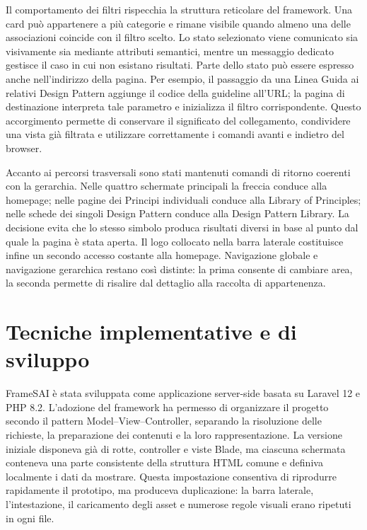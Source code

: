 Il comportamento dei filtri rispecchia la struttura reticolare del framework. Una card può appartenere a più categorie e rimane visibile quando almeno una delle associazioni coincide con il filtro scelto. Lo stato selezionato viene comunicato sia visivamente sia mediante attributi semantici, mentre un messaggio dedicato gestisce il caso in cui non esistano risultati. Parte dello stato può essere espresso anche nell'indirizzo della pagina. Per esempio, il passaggio da una Linea Guida ai relativi Design Pattern aggiunge il codice della guideline all'URL; la pagina di destinazione interpreta tale parametro e inizializza il filtro corrispondente. Questo accorgimento permette di conservare il significato del collegamento, condividere una vista già filtrata e utilizzare correttamente i comandi avanti e indietro del browser.

Accanto ai percorsi trasversali sono stati mantenuti comandi di ritorno coerenti con la gerarchia. Nelle quattro schermate principali la freccia conduce alla homepage; nelle pagine dei Principi individuali conduce alla Library of Principles; nelle schede dei singoli Design Pattern conduce alla Design Pattern Library. La decisione evita che lo stesso simbolo produca risultati diversi in base al punto dal quale la pagina è stata aperta. Il logo collocato nella barra laterale costituisce infine un secondo accesso costante alla homepage. Navigazione globale e navigazione gerarchica restano così distinte: la prima consente di cambiare area, la seconda permette di risalire dal dettaglio alla raccolta di appartenenza.

\section{Tecniche implementative e di sviluppo}

FrameSAI è stata sviluppata come applicazione server-side basata su Laravel 12 e PHP 8.2. L'adozione del framework ha permesso di organizzare il progetto secondo il pattern Model--View--Controller, separando la risoluzione delle richieste, la preparazione dei contenuti e la loro rappresentazione. La versione iniziale disponeva già di rotte, controller e viste Blade, ma ciascuna schermata conteneva una parte consistente della struttura HTML comune e definiva localmente i dati da mostrare. Questa impostazione consentiva di riprodurre rapidamente il prototipo, ma produceva duplicazione: la barra laterale, l'intestazione, il caricamento degli asset e numerose regole visuali erano ripetuti in ogni file.

